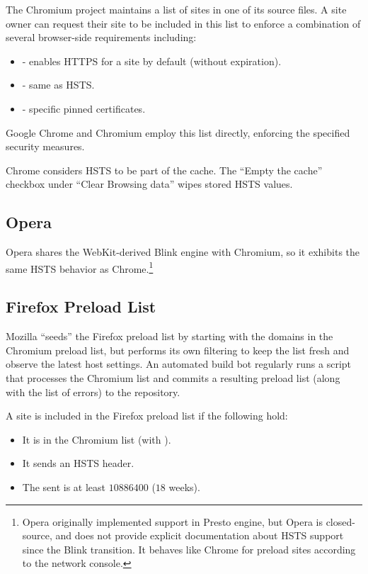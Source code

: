 \documentclass{acm_proc_article-sp}
\begin{document}
{The Chromium project maintains a list of sites in one of its source files\cite{sts-list}. A site owner can request their site to be included in this list to enforce a combination of several browser-side requirements including:

\begin{itemize}
\item {} - enables HTTPS for a site by default (without expiration).
\item {\iSD} - same as HSTS.
\item {} - specific pinned certificates.
\end{itemize}

Google Chrome and Chromium employ this list directly, enforcing the specified security measures.

Chrome considers HSTS to be part of the cache. The ``Empty the cache'' checkbox under ``Clear Browsing data'' wipes stored HSTS values.

\subsection{Opera}

Opera shares the WebKit-derived Blink engine with Chromium, so it exhibits the same HSTS behavior as Chrome.\footnote{Opera originally implemented support in Presto engine\cite{opera}, but Opera is closed-source, and does not provide explicit documentation about HSTS support since the Blink transition. It behaves like Chrome for preload sites according to the network console.}

\subsection{Firefox Preload List}

Mozilla ``seeds'' the Firefox preload list by starting with the domains in the Chromium preload list, but performs its own filtering to keep the list fresh and observe the latest host settings. An automated build bot\cite{firefox-cron} regularly runs\cite{firefox-cron-script} a script\cite{firefox-script} that processes the Chromium list and commits a resulting preload list\cite{firefox-list} (along with the list of errors\cite{firefox-errors}) to the  repository.

A site is included in the Firefox preload list if the following hold:

\begin{itemize}
\item It is in the Chromium list (with ).
\item It sends an HSTS header.
\item The  sent is at least $10886400$ ($18$ weeks).
\end{itemize}

}
\end{document}
